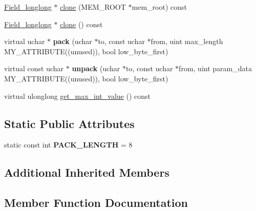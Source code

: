 \begin{DoxyCompactItemize}
\item 
\mbox{\hyperlink{classField__longlong}{Field\+\_\+longlong}} $\ast$ \mbox{\hyperlink{classField__longlong_a67bbde6aa732e4f5717efd9ebb0a1e30}{clone}} (M\+E\+M\+\_\+\+R\+O\+OT $\ast$mem\+\_\+root) const
\item 
\mbox{\hyperlink{classField__longlong}{Field\+\_\+longlong}} $\ast$ \mbox{\hyperlink{classField__longlong_a0b2379549b5b74daf1027b19f01f4b55}{clone}} () const
\item 
\mbox{\label{classField__longlong_af566322af60e7c70e7665c4ad07a28ec}} 
virtual uchar $\ast$ {\bfseries pack} (uchar $\ast$to, const uchar $\ast$from, uint max\+\_\+length M\+Y\+\_\+\+A\+T\+T\+R\+I\+B\+U\+TE((unused)), bool low\+\_\+byte\+\_\+first)
\item 
\mbox{\label{classField__longlong_a40989aa4168fd56599ee04f2d25f9256}} 
virtual const uchar $\ast$ {\bfseries unpack} (uchar $\ast$to, const uchar $\ast$from, uint param\+\_\+data M\+Y\+\_\+\+A\+T\+T\+R\+I\+B\+U\+TE((unused)), bool low\+\_\+byte\+\_\+first)
\item 
virtual ulonglong \mbox{\hyperlink{classField__longlong_a6d530e3dbf852f37e768c8875783cc8c}{get\+\_\+max\+\_\+int\+\_\+value}} () const
\end{DoxyCompactItemize}
\subsection*{Static Public Attributes}
\begin{DoxyCompactItemize}
\item 
\mbox{\label{classField__longlong_a06399d07a9168c2c7268bdb13eafae5a}} 
static const int {\bfseries P\+A\+C\+K\+\_\+\+L\+E\+N\+G\+TH} = 8
\end{DoxyCompactItemize}
\subsection*{Additional Inherited Members}


\subsection{Member Function Documentation}
\mbox{\label{classField__longlong_a67bbde6aa732e4f5717efd9ebb0a1e30}} 
